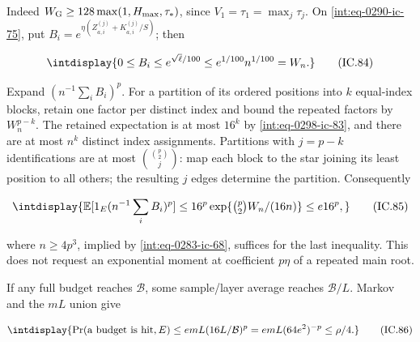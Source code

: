 Indeed \(W_{\rm G}\ge128\max(1,\allowbreak H_{\max},\allowbreak \tau_*)\), since \(V_1=\tau_1=\max_j\tau_j\). On \eqref{int:eq-0290-ic-75}, put \(B_i=e^{\eta(Z_{a,\allowbreak i}^{(j)}+K_{a,\allowbreak i}^{(j)}/S)}\); then


\begingroup\renewcommand{\theHequation}{intdisplay.682}
\begin{equation}
\intdisplay{
0\le B_i\le e^{\sqrt\ell/100}\le e^{1/100}n^{1/100}=W_n.
}
\tag{IC.84}
\label{int:eq-0299-ic-84}
\end{equation}
\endgroup


Expand \((n^{-1}\sum_i B_i)^p\). For a partition of its ordered positions into \(k\) equal-index blocks, retain one factor per distinct index and bound the repeated factors by \(W_n^{p-k}\). The retained expectation is at most \(16^k\) by \eqref{int:eq-0298-ic-83}, and there are at most \(n^k\) distinct index assignments. Partitions with \(j=p-k\) identifications are at most \(\binom{\binom p2}{j}\): map each block to the star joining its least position to all others; the resulting \(j\) edges determine the partition. Consequently


\begingroup\renewcommand{\theHequation}{intdisplay.683}
\begin{equation}
\intdisplay{
\mathbb E[1_E(n^{-1}\sum_iB_i)^p]
 \le16^p\exp\{\tbinom p2 W_n/(16n)\}\le e16^p,
}
\tag{IC.85}
\label{int:eq-0300-ic-85}
\end{equation}
\endgroup


where \(n\ge4p^3\), implied by \eqref{int:eq-0283-ic-68}, suffices for the last inequality. This does not request an exponential moment at coefficient \(p\eta\) of a repeated main root.



If any full budget reaches \(\mathcal B\), some sample/layer average reaches \(\mathcal B/L\). Markov and the \(mL\) union give


\begingroup\renewcommand{\theHequation}{intdisplay.684}
\begin{equation}
\intdisplay{
\Pr(\hbox{a budget is hit},E)
 \le emL(16L/\mathcal B)^p
 =emL(64e^2)^{-p}\le\rho/4.
}
\tag{IC.86}
\label{int:eq-0301-ic-86}
\end{equation}
\endgroup


